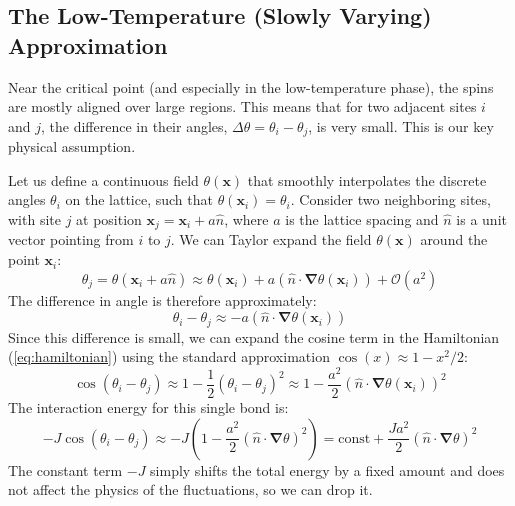 \documentclass[11pt, a4paper, article]{article}
\renewcommand{\vec}[1]{\bm{#1}} %
\begin{document}
\subsection{The Low-Temperature (Slowly Varying) Approximation}
Near the critical point (and especially in the low-temperature phase), the spins are mostly aligned over large regions. This means that for two adjacent sites $i$ and $j$, the difference in their angles, $\Delta\theta = \theta_i - \theta_j$, is very small. This is our key physical assumption.

Let us define a continuous field $\theta(\vec{x})$ that smoothly interpolates the discrete angles $\theta_i$ on the lattice, such that $\theta(\vec{x}_i) = \theta_i$. Consider two neighboring sites, with site $j$ at position $\vec{x}_j = \vec{x}_i + a\hat{n}$, where $a$ is the lattice spacing and $\hat{n}$ is a unit vector pointing from $i$ to $j$. We can Taylor expand the field $\theta(\vec{x})$ around the point $\vec{x}_i$:
\begin{equation}
    \theta_j = \theta(\vec{x}_i + a\hat{n}) \approx \theta(\vec{x}_i) + a (\hat{n} \cdot \vec{\nabla}\theta(\vec{x}_i)) + \mathcal{O}(a^2)
\end{equation}
The difference in angle is therefore approximately:
\begin{equation}
    \theta_i - \theta_j \approx -a (\hat{n} \cdot \vec{\nabla}\theta(\vec{x}_i))
\end{equation}
Since this difference is small, we can expand the cosine term in the Hamiltonian (\ref{eq:hamiltonian}) using the standard approximation $\cos(x) \approx 1 - x^2/2$:
\begin{equation}
    \cos(\theta_i - \theta_j) \approx 1 - \frac{1}{2}(\theta_i - \theta_j)^2 \approx 1 - \frac{a^2}{2} (\hat{n} \cdot \vec{\nabla}\theta(\vec{x}_i))^2
\end{equation}
The interaction energy for this single bond is:
\begin{equation}
    -J \cos(\theta_i - \theta_j) \approx -J \left(1 - \frac{a^2}{2} (\hat{n} \cdot \vec{\nabla}\theta)^2\right) = \text{const} + \frac{Ja^2}{2} (\hat{n} \cdot \vec{\nabla}\theta)^2
\end{equation}
The constant term $-J$ simply shifts the total energy by a fixed amount and does not affect the physics of the fluctuations, so we can drop it.
\end{document}
